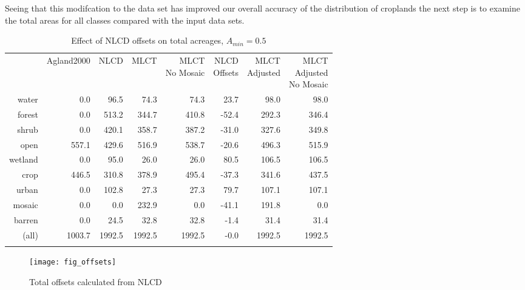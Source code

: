 Seeing that this modifcation to the data set has improved our overall
accuracy of the distribution of croplands the next step is to examine
the total areas for all classes compared with the input data sets.  


\begin{table}[ht]
\begin{center}
{\small
\begin{tabular}{rrrrrrrr}
  \hline
 & Agland2000 & NLCD & MLCT & \pbox[c][][c]{3in}{MLCT\\No Mosaic} & \pbox[c][][c]{3in}{NLCD\\Offsets} & \pbox[c][][c]{3in}{MLCT\\Adjusted} & \pbox[c][][c]{3in}{\smallskip{}MLCT\\Adjusted\\No Mosaic} \\ 
  \noalign{\smallskip} \hline
water & 0.0 & 96.5 & 74.3 & 74.3 & 23.7 & 98.0 & 98.0 \\ 
  forest & 0.0 & 513.2 & 344.7 & 410.8 & -52.4 & 292.3 & 346.4 \\ 
  shrub & 0.0 & 420.1 & 358.7 & 387.2 & -31.0 & 327.6 & 349.8 \\ 
  open & 557.1 & 429.6 & 516.9 & 538.7 & -20.6 & 496.3 & 515.9 \\ 
  wetland & 0.0 & 95.0 & 26.0 & 26.0 & 80.5 & 106.5 & 106.5 \\ 
  crop & 446.5 & 310.8 & 378.9 & 495.4 & -37.3 & 341.6 & 437.5 \\ 
  urban & 0.0 & 102.8 & 27.3 & 27.3 & 79.7 & 107.1 & 107.1 \\ 
  mosaic & 0.0 & 0.0 & 232.9 & 0.0 & -41.1 & 191.8 & 0.0 \\ 
  barren & 0.0 & 24.5 & 32.8 & 32.8 & -1.4 & 31.4 & 31.4 \\ 
  (all) & 1003.7 & 1992.5 & 1992.5 & 1992.5 & -0.0 & 1992.5 & 1992.5 \\ 
   \noalign{\smallskip} \hline
\end{tabular}
}
\caption{Effect of NLCD offsets on total acreages, $A_{min}=0.5$}
\label{tab:areas2}
\end{center}
\end{table}
\begin{figure}[hpt]
  \centering

 

  \texttt{[image: fig\_offsets]}
  \caption{Total offsets calculated from NLCD}
  \label{fig:offsets}
\end{figure}


